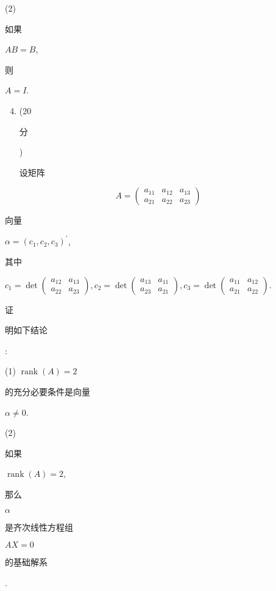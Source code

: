 \documentclass[10pt]{article}
\begin{document}
(2) \begin{CJK}{UTF8}{mj}如果\end{CJK} $A B=B$, \begin{CJK}{UTF8}{mj}则\end{CJK} $A=I$.

\begin{enumerate}
  \setcounter{enumi}{3}
  \item (20\begin{CJK}{UTF8}{mj}分\end{CJK}) \begin{CJK}{UTF8}{mj}设矩阵\end{CJK}
\end{enumerate}
$$
A=\left(\begin{array}{lll}
a_{11} & a_{12} & a_{13} \\
a_{21} & a_{22} & a_{23}
\end{array}\right)
$$
\begin{CJK}{UTF8}{mj}向量\end{CJK} $\alpha=\left(c_{1}, c_{2}, c_{3}\right)^{\prime}$, \begin{CJK}{UTF8}{mj}其中\end{CJK} $c_{1}=\operatorname{det}\left(\begin{array}{ll}a_{12} & a_{13} \\ a_{22} & a_{23}\end{array}\right), c_{2}=\operatorname{det}\left(\begin{array}{ll}a_{13} & a_{11} \\ a_{23} & a_{21}\end{array}\right), c_{3}=\operatorname{det}\left(\begin{array}{ll}a_{11} & a_{12} \\ a_{21} & a_{22}\end{array}\right)$. \begin{CJK}{UTF8}{mj}证\end{CJK} \begin{CJK}{UTF8}{mj}明如下结论\end{CJK}:

(1) $\operatorname{rank}(A)=2$ \begin{CJK}{UTF8}{mj}的充分必要条件是向量\end{CJK} $\alpha \neq 0$.

(2) \begin{CJK}{UTF8}{mj}如果\end{CJK} $\operatorname{rank}(A)=2$, \begin{CJK}{UTF8}{mj}那么\end{CJK} $\alpha$ \begin{CJK}{UTF8}{mj}是齐次线性方程组\end{CJK} $A X=0$ \begin{CJK}{UTF8}{mj}的基础解系\end{CJK}.
\end{document}
